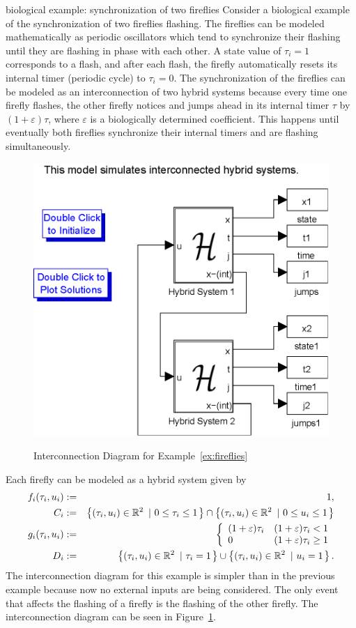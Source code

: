 
\begin{example}{biological example: synchronization of two fireflies}
\label{ex:fireflies}
Consider a biological example of the synchronization of two fireflies flashing. The fireflies can be modeled mathematically as periodic oscillators which tend to synchronize their flashing until they are flashing in phase with each other. A state value of $\tau_i=1$ corresponds to a flash, and after each flash, the firefly automatically resets its internal timer (periodic cycle) to $\tau_i=0$.  The synchronization of the fireflies can be modeled as an interconnection of two hybrid systems because every time one firefly flashes, the other firefly notices and jumps ahead in its internal timer $\tau$ by $(1+\varepsilon)\tau$, where $\varepsilon$ is a biologically determined coefficient. This happens until eventually both fireflies synchronize their internal timers and are flashing simultaneously.  \begin{figure}[ht!]
  \begin{center}
    {\includegraphics[width=.45\textwidth]{figures/Simulink/fireflies.eps}}
   \caption{Interconnection Diagram for Example~\ref{ex:fireflies}}
\label{fig:fireflies}
  \end{center}
\end{figure}
Each firefly can be modeled as a hybrid system given by
\begin{eqnarray}
f_i(\tau_i,u_i) & := & 1, \\
C_i &: =& \left\{(\tau_i,u_i)\in {\mathbb R}^{2}\ \left| \ 0 \leq \tau_i \leq 1 \right.\right\}\cap
\left\{(\tau_i,u_i)\in {\mathbb R}^{2}\ \left| \ 0 \leq u_i \leq 1 \right.\right\} \\
g_i(\tau_i,u_i) &:=&
\left\{
\begin{array}{ll}
(1+ \varepsilon)\tau_i
& (1+\varepsilon)\tau_i<1\\
0
& (1+\varepsilon)\tau_i\geq 1
\end{array}
\right. \\
    D_i &: =& \left\{(\tau_i,u_i)\in {\mathbb R}^{2}\ \left| \ \tau_i = 1 \right.\right\} \cup \left\{(\tau_i,u_i)\in {\mathbb R}^{2}\ \left| \ u_i = 1 \right.\right\}.
\end{eqnarray}
The interconnection diagram for this example is simpler than in the previous example because now no external inputs are being considered. The only event that affects the flashing of a firefly is the flashing of the other firefly. The interconnection diagram can be seen in Figure~\ref{fig:fireflies}.


\end{example}
